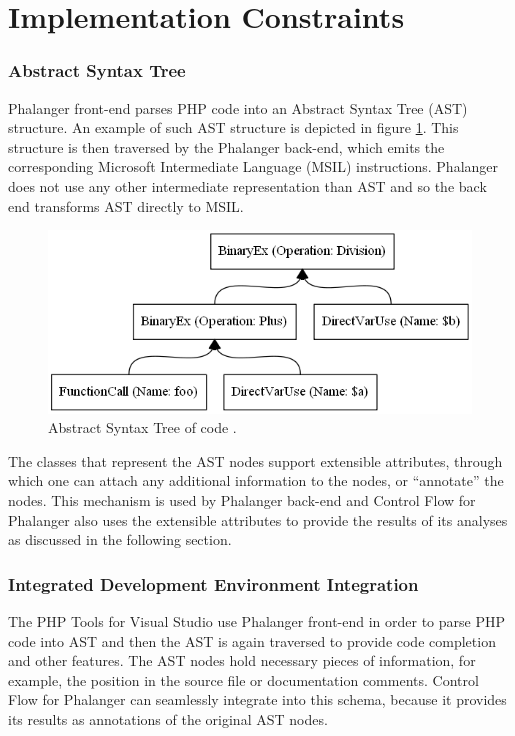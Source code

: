    \section{Implementation Constraints}
    
    \subsubsection*{Abstract Syntax Tree}     
    Phalanger front-end parses PHP code into an Abstract 
    Syntax Tree (AST) \cite{aho1985compilers} structure. 
    An example of such AST structure is depicted in 
    figure \ref{estexample}. This structure is then traversed 
    by the Phalanger back-end, which emits the 
    corresponding Microsoft Intermediate Language 
    (MSIL) instructions. Phalanger does not use any other 
    intermediate representation than AST and so the back end 
    transforms AST directly to MSIL.
    
\begin{figure}[h]  
  \centering
    \includegraphics*[scale=0.5]{graphs/evaltree-ast.png}  
    \caption{Abstract Syntax Tree of code .\label{estexample}}
\end{figure}      
    
    The classes that represent the AST nodes support extensible 
    attributes, through which one can attach any additional 
    information to the nodes, or ``annotate'' the nodes. 
    This mechanism is used by Phalanger back-end and 
    Control Flow for Phalanger also uses the extensible 
    attributes to provide the results 
    of its analyses as discussed in the following section.
    
    \subsubsection*{Integrated Development Environment Integration}
    The PHP Tools for Visual Studio use Phalanger 
    front-end in order to parse PHP code into AST 
    and then the AST is again traversed to provide 
    code completion and other features. The AST nodes 
    hold necessary pieces of information, for example, 
    the position in the source file or documentation comments.
    Control Flow for Phalanger can seamlessly integrate 
    into this schema, because it provides its results 
    as annotations of the original AST nodes.
    
